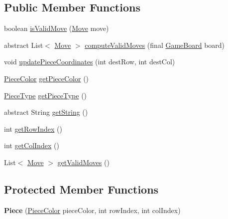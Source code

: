 \subsection*{Public Member Functions}
\begin{DoxyCompactItemize}
\item 
boolean \mbox{\hyperlink{classpieces_1_1_piece_a24536ff95674905f18a7fd9fadde52ce}{is\+Valid\+Move}} (\mbox{\hyperlink{classpieces_1_1_move}{Move}} move)
\item 
abstract List$<$ \mbox{\hyperlink{classpieces_1_1_move}{Move}} $>$ \mbox{\hyperlink{classpieces_1_1_piece_ab9a0e46deaaa05e8bea7a59ccda801ab}{compute\+Valid\+Moves}} (final \mbox{\hyperlink{classgameboard_1_1_game_board}{Game\+Board}} board)
\item 
void \mbox{\hyperlink{classpieces_1_1_piece_abad4a76991f2de3a31187c2a74c2f870}{update\+Piece\+Coordinates}} (int dest\+Row, int dest\+Col)
\item 
\mbox{\hyperlink{enumpieces_1_1_piece_1_1_piece_color}{Piece\+Color}} \mbox{\hyperlink{classpieces_1_1_piece_a3442ea119c005e9736d5cd53efd499e8}{get\+Piece\+Color}} ()
\item 
\mbox{\hyperlink{enumpieces_1_1_piece_1_1_piece_type}{Piece\+Type}} \mbox{\hyperlink{classpieces_1_1_piece_acd116a1f6e774bc7d358780c098fadcb}{get\+Piece\+Type}} ()
\item 
abstract String \mbox{\hyperlink{classpieces_1_1_piece_a12cbd905036c427015bd3c62fdb17036}{get\+String}} ()
\item 
int \mbox{\hyperlink{classpieces_1_1_piece_a298b5268de024c41b2af48306fa40e03}{get\+Row\+Index}} ()
\item 
int \mbox{\hyperlink{classpieces_1_1_piece_a5ac1137f5b634718b310ba4b01d3a592}{get\+Col\+Index}} ()
\item 
List$<$ \mbox{\hyperlink{classpieces_1_1_move}{Move}} $>$ \mbox{\hyperlink{classpieces_1_1_piece_aa4bfcbf5e6e3c1374c0ca3af0c64b87d}{get\+Valid\+Moves}} ()
\end{DoxyCompactItemize}
\subsection*{Protected Member Functions}
\begin{DoxyCompactItemize}
\item 
\mbox{\label{classpieces_1_1_piece_aa02280c819d5ab7472b50a1026ca2e9d}} 
{\bfseries Piece} (\mbox{\hyperlink{enumpieces_1_1_piece_1_1_piece_color}{Piece\+Color}} piece\+Color, int row\+Index, int col\+Index)
\end{DoxyCompactItemize}


